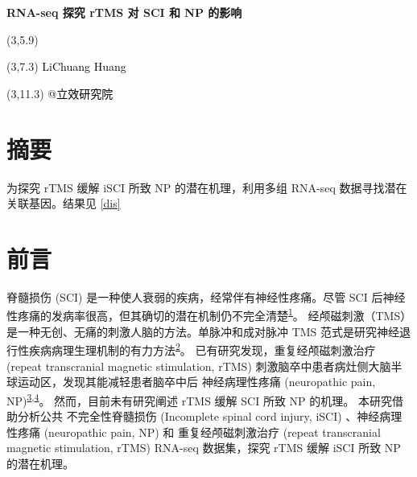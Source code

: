 \documentclass[
]{article}
\author{}
\date{\vspace{-2.5em}}
\begin{document}
\begin{titlepage} 
\begin{center} \textbf{\Huge RNA-seq 探究 rTMS 对
SCI 和 NP 的影响} \vspace{4em}
\begin{textblock}{10}(3,5.9) \huge
\textbf{\textcolor{white}{2023-12-12}}
\end{textblock} \begin{textblock}{10}(3,7.3)
\Large \textcolor{black}{LiChuang Huang}
\end{textblock} \begin{textblock}{10}(3,11.3)
\Large \textcolor{black}{@立效研究院}
\end{textblock} \end{center} \end{titlepage}
\restoregeometry


\tableofcontents

\listoffigures

\listoftables

\newpage


\hypertarget{abstract}{%
\section{摘要}\label{abstract}}

为探究 rTMS 缓解 iSCI 所致 NP 的潜在机理，利用多组 RNA-seq 数据寻找潜在关联基因。结果见 \ref{dis}

\hypertarget{introduction}{%
\section{前言}\label{introduction}}

脊髓损伤 (SCI) 是一种使人衰弱的疾病，经常伴有神经性疼痛。尽管 SCI 后神经性疼痛的发病率很高，但其确切的潜在机制仍不完全清楚\textsuperscript{\protect\hyperlink{ref-TheDualRoleOSunC2023}{1}}。
经颅磁刺激（TMS）是一种无创、无痛的刺激人脑的方法。单脉冲和成对脉冲 TMS 范式是研究神经退行性疾病病理生理机制的有力方法\textsuperscript{\protect\hyperlink{ref-TranscranialMaNiZh2015}{2}}。
已有研究发现，重复经颅磁刺激治疗 (repeat transcranial magnetic stimulation, rTMS) 刺激脑卒中患者病灶侧大脑半球运动区，发现其能减轻患者脑卒中后 神经病理性疼痛 (neuropathic pain, NP)\textsuperscript{\protect\hyperlink{ref-DifferentialEfAmeli2009}{3},\protect\hyperlink{ref-ReductionOfInHiraya2006}{4}}。
然而，目前未有研究阐述 rTMS 缓解 SCI 所致 NP 的机理。
本研究借助分析公共 不完全性脊髓损伤 (Incomplete spinal cord injury, iSCI) 、神经病理性疼痛 (neuropathic pain, NP) 和 重复经颅磁刺激治疗 (repeat transcranial magnetic stimulation, rTMS) RNA-seq 数据集，探究 rTMS 缓解 iSCI 所致 NP 的潜在机理。
\end{document}
